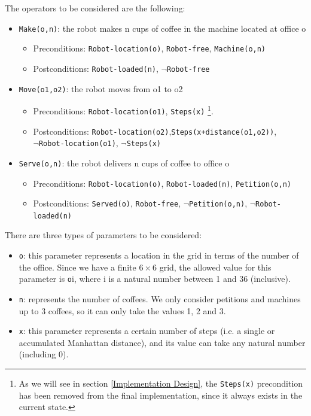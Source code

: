 \documentclass[12pt,a4paper,oneside]{article}
\numberwithin{equation}{section}
\numberwithin{equation}{section}
\theoremstyle{definition}
\begin{document}
The operators to be considered are the following:
\begin{itemize}
	\item \texttt{Make(o,n)}: the robot makes n cups of coffee in the machine located at office o
	\begin{itemize}
		\item Preconditions: \texttt{Robot-location(o)}, \texttt{Robot-free}, \texttt{Machine(o,n)}
		\item Postconditions: \texttt{Robot-loaded(n)}, $\neg$\texttt{Robot-free}
	\end{itemize}
	\item \texttt{Move(o1,o2)}: the robot moves from o1 to o2
	\begin{itemize}
		\item Preconditions: \texttt{Robot-location(o1)}, \texttt{Steps(x)} \footnote{As we will see in section \ref{Implementation Design}, the \texttt{Steps(x)} precondition has been removed from the final implementation, since it always exists in the current state.}.
		\item Postconditions: \texttt{Robot-location(o2)},\texttt{Steps(x+distance(o1,o2))}, \\
		$\neg$\texttt{Robot-location(o1)}, $\neg$\texttt{Steps(x)}
	\end{itemize}
	\item \texttt{Serve(o,n)}: the robot delivers n cups of coffee to office o
	\begin{itemize}
		\item Preconditions: \texttt{Robot-location(o)}, \texttt{Robot-loaded(n)}, \texttt{Petition(o,n)}
		\item Postconditions: \texttt{Served(o)}, \texttt{Robot-free}, $\neg$\texttt{Petition(o,n)}, $\neg$\texttt{Robot-loaded(n)}
	\end{itemize}
\end{itemize}

There are three types of parameters to be considered:
\begin{itemize}
	\item \texttt{o}: this parameter represents a location in the grid in terms of the number of the office. Since we have a finite $6 \times 6$ grid, the allowed value for this parameter is \texttt{o}i, where i is a natural number between 1 and 36 (inclusive).
	\item \texttt{n}: represents the number of coffees. We only consider petitions and machines up to 3 coffees, so it can only take the values 1, 2 and 3.
	\item \texttt{x}: this parameter represents a certain number of steps (i.e. a single or accumulated Manhattan distance), and its value can take any natural number (including 0). 
\end{itemize}
\end{document}
